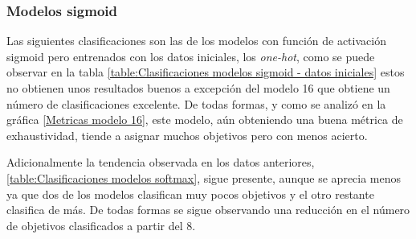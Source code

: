 \subsubsection{Modelos sigmoid}
Las siguientes clasificaciones son las de los modelos con función de activación
sigmoid pero entrenados con los datos iniciales, los \textit{one-hot}, como se
puede observar en la tabla \cref{table:Clasificaciones modelos sigmoid - datos
iniciales} estos no obtienen unos resultados buenos a excepción del modelo 16
que obtiene un número de clasificaciones excelente. De todas formas, y como se
analizó en la gráfica \cref{Metricas modelo 16}, este modelo, aún obteniendo una
buena métrica de exhaustividad, tiende a asignar muchos objetivos pero con menos
acierto.

Adicionalmente la tendencia observada en los datos anteriores,
\cref{table:Clasificaciones modelos softmax}, sigue presente, aunque se aprecia
menos ya que dos de los modelos clasifican muy pocos objetivos y el otro
restante clasifica de más. De todas formas se sigue observando una reducción en
el número de objetivos clasificados a partir del 8.

